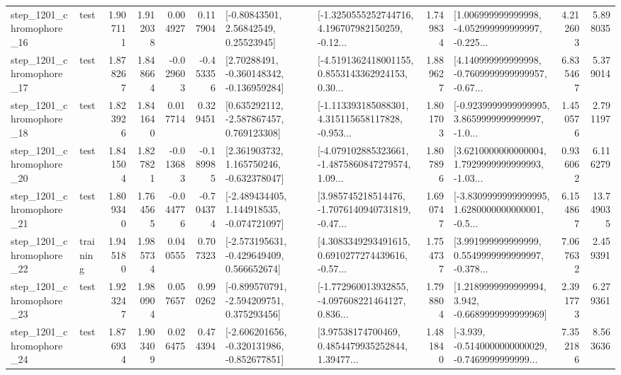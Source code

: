 \begin{tabular}{llrrrrllrlrr}
 step\_1201\_chromophore\_16 &      test &      1.907111 &    1.912038 &      0.004927 &  0.117904 &       [-0.80843501, 2.56842549, 0.25523945] &  [-1.3250555252744716, 4.196707982150259, -0.12... &       1.749834 &  [1.006999999999998, -4.052999999999997, -0.225... &            4.212603 &          5.898035 \\
 step\_1201\_chromophore\_17 &      test &      1.878267 &    1.848664 &     -0.029603 & -0.453356 &    [2.70288491, -0.360148342, -0.136959284] &  [-4.5191362418001155, 0.8553143362924153, 0.30... &       1.889627 &  [4.140999999999998, -0.7609999999999957, -0.67... &            6.835467 &          5.379014 \\
 step\_1201\_chromophore\_18 &      test &      1.823926 &    1.841640 &      0.017714 &  0.329451 &    [0.635292112, -2.587867457, 0.769123308] &  [-1.113393185088301, 4.315115658117828, -0.953... &       1.801703 &  [-0.9239999999999995, 3.8659999999999997, -1.0... &            1.450576 &          2.791197 \\
 step\_1201\_chromophore\_20 &      test &      1.841504 &    1.827821 &     -0.013683 & -0.189985 &    [2.361903732, 1.165750246, -0.632378047] &  [-4.079102885323661, -1.4875860847279574, 1.09... &       1.807896 &  [3.6210000000000004, 1.7929999999999993, -1.03... &            0.936062 &          6.116279 \\
 step\_1201\_chromophore\_21 &      test &      1.809340 &    1.764565 &     -0.044776 & -0.704374 &   [-2.489434405, 1.144918535, -0.074721097] &  [3.985745218514476, -1.7076140940731819, -0.47... &       1.690747 &  [-3.8309999999999995, 1.6280000000000001, -0.5... &            6.154867 &         13.749035 \\
 step\_1201\_chromophore\_22 &  training &      1.945180 &    1.985734 &      0.040555 &  0.707323 &   [-2.573195631, -0.429649409, 0.566652674] &  [4.3083349293491615, 0.6910277274439616, -0.57... &       1.754737 &  [3.991999999999999, 0.5549999999999997, -0.378... &            7.067632 &          2.459391 \\
 step\_1201\_chromophore\_23 &      test &      1.923247 &    1.980904 &      0.057657 &  0.990262 &   [-0.899570791, -2.594209751, 0.375293456] &  [-1.772960013932855, -4.097608221464127, 0.836... &       1.798804 &   [1.2189999999999994, 3.942, -0.6689999999999969] &            2.391773 &          6.279361 \\
 step\_1201\_chromophore\_24 &      test &      1.876934 &    1.903409 &      0.026475 &  0.474394 &  [-2.606201656, -0.320131986, -0.852677851] &  [3.97538174700469, 0.4854479935252844, 1.39477... &       1.481840 &  [-3.939, -0.5140000000000029, -0.7469999999999... &            7.352186 &          8.563636 \\

\end{tabular}
